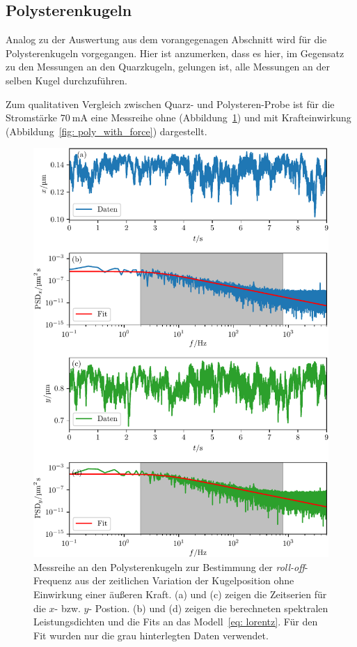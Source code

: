 

\FloatBarrier
\newpage
\subsection{Polysterenkugeln}
Analog zu der Auswertung aus dem vorangegenagen Abschnitt wird für die Polysterenkugeln vorgegangen.
Hier ist anzumerken, dass es hier, im Gegensatz zu den Messungen an den Quarzkugeln, gelungen ist, alle
Messungen an der selben Kugel durchzuführen.

Zum qualitativen Vergleich zwischen Quarz- und Polysteren-Probe ist für die
Stromstärke $\SI{70}{\milli\ampere}$ eine Messreihe ohne (Abbildung~\ref{fig: poly_without_force}) und
mit Krafteinwirkung (Abbildung~\ref{fig: poly_with_force}) dargestellt.
\begin{figure}
  \centering
  \includegraphics[scale = 1]{../analysis/data/i_quarz/70mA/results/without_force_70mA.pdf}
  \caption{Messreihe an den Polysterenkugeln zur Bestimmung der \emph{roll-off}-Frequenz aus der zeitlichen Variation der Kugelposition ohne Einwirkung einer äußeren Kraft.
  (a) und (c) zeigen die Zeitserien für die $x$- bzw. $y$- Postion. (b) und (d) zeigen die berechneten spektralen Leistungsdichten und die Fits an das
  Modell~\eqref{eq: lorentz}. Für den Fit wurden nur die grau hinterlegten Daten verwendet.}
  \label{fig: poly_without_force}
\end{figure}
